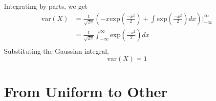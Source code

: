 \documentclass[journal, 12pt, twocolumn]{IEEEtran}
\begin{document}
\begin{enumerate}[label=\arabic{section}.\arabic*]
        Integrating by parts, we get
        \begin{align}
            \text{var}(X) &= \frac{1}{\sqrt{2 \pi}}\left(-x \text{exp}\left(\frac{-x^2}{2}\right) + \int{\text{exp}\left(\frac{-x^2}{2}\right) dx}\right) \Bigg|_{-\infty}^{\infty} \\
            &= \frac{1}{\sqrt{2 \pi}} \int_{-\infty}^{\infty}{\text{exp}\left(\frac{-x^2}{2}\right) dx} \\
        \end{align}
        Substituting the Gaussian integral,
        \begin{equation}
            \text{var}(X) = 1
        \end{equation}

\end{enumerate}

\section{From Uniform to Other}
\end{document}
